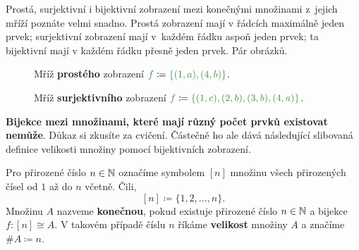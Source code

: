 Prostá, surjektivní i bijektivní zobrazení mezi konečnými množinami z~jejich
mříží poznáte velmi snadno. Prostá zobrazení mají v řádcích maximálně jeden
prvek; surjektivní zobrazení mají v~každém řádku aspoň jeden prvek; ta
bijektivní mají v každém řádku přesně jeden prvek. Pár obrázků.

\begin{figure}[h]
 \centering
 \caption{Mříž \textbf{prostého} zobrazení $\clg{f} \coloneqq
 \clg{\{(1,a),(4,b)\}}$.}
 \label{fig:mriz-proste}
\end{figure}
\newpage

\begin{figure}[h]
 \centering
 \caption{Mříž \textbf{surjektivního} zobrazení $\clg{f} \coloneqq
 \clg{\{(1,c),(2,b),(3,b),(4,a)\}}$.}
 \label{fig:mriz-surjektivni}
\end{figure}

\textbf{Bijekce mezi množinami, které mají různý počet prvků existovat nemůže}.
Důkaz si zkusíte za cvičení. Částečně ho ale dává následující slibovaná definice
velikosti množiny pomocí bijektivních zobrazení.

\begin{definition}
 \label{def:velikost-mnoziny-poradne}
 Pro přirozené číslo $n \in \mathbb{N}$ označíme symbolem $[n]$ množinu všech
 přirozených čísel od $1$ až do $n$ včetně. Čili,
 \[
  [n] \coloneqq \{1,2,\ldots,n\}.
 \]
 Množinu $A$ nazveme \textbf{konečnou}, pokud existuje přirozené číslo ${n \in
 \mathbb{N}}$ a bijekce $f:[n] \cong A$. V takovém případě číslu $n$ říkáme
 \textbf{velikost} množiny $A$ a značíme $\# A \coloneqq n$.
\end{definition}

